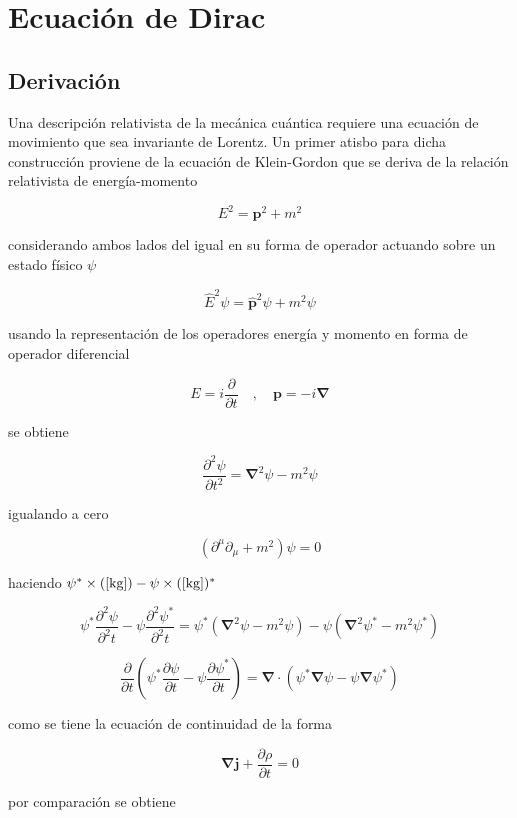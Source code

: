 \chapter{Ecuación de Dirac}

\section{Derivación}

Una descripción relativista de la mecánica cuántica requiere una ecuación de movimiento que sea invariante de Lorentz. Un primer atisbo para dicha construcción proviene de la ecuación de Klein-Gordon que se deriva de la relación relativista de energía-momento 

$$ E^2 = \textbf{p}^2 +m^2 $$

considerando ambos lados del igual en su forma de operador actuando sobre un estado físico $\psi$

$$ \hat{E}^2\psi = \hat{\textbf{p}}^2\psi + m^2\psi $$

usando la representación de los operadores energía y momento en forma de operador diferencial

$$ E = i\frac{\partial}{\partial t} \quad , \quad \textbf{p} = -i\boldsymbol\nabla $$

se obtiene

\begin{equation}
    \frac{\partial^2 \psi}{\partial t^2} = \boldsymbol\nabla^2\psi -m^2\psi
    \label{kg}
\end{equation}

igualando a cero

$$ (\partial^{\mu}\partial_{\mu} + m^2)\psi = 0 $$

haciendo $\psi^*\times (\ref{kg}) - \psi \times (\ref{kg})^*$


$$ \psi^*\frac{\partial^2 \psi}{\partial^2 t} - \psi\frac{\partial^2 \psi^*}{\partial^2 t} = \psi^*(\boldsymbol\nabla^2\psi -m^2\psi) - \psi (\boldsymbol\nabla^2\psi^* -m^2\psi^*) $$

$$ \frac{\partial}{\partial t}\left( \psi^*\frac{\partial \psi}{\partial t} - \psi\frac{\partial \psi^*}{\partial t} \right) = \boldsymbol\nabla \cdot (\psi^*\boldsymbol\nabla \psi - \psi\boldsymbol\nabla \psi^*) $$

como se tiene la ecuación de continuidad de la forma

$$ \boldsymbol\nabla \textbf{j} + \frac{\partial \rho}{\partial t} = 0 $$

por comparación se obtiene

